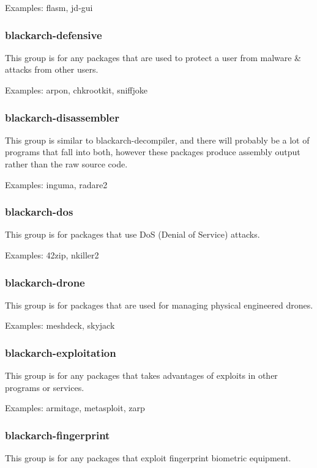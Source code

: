 \documentclass[a4paper, oneside, 11pt]{book}
\begin{document}
Examples: flasm, jd-gui

\subsubsection{blackarch-defensive}

This group is for any packages that are used to protect a user from malware \& attacks from other users.

Examples: arpon, chkrootkit, sniffjoke

\subsubsection{blackarch-disassembler}

This group is similar to blackarch-decompiler, and there will probably be a lot of programs that fall into both, however these packages produce assembly output rather than the raw source code.

Examples: inguma, radare2

\subsubsection{blackarch-dos}

This group is for packages that use DoS (Denial of Service) attacks.

Examples: 42zip, nkiller2

\subsubsection{blackarch-drone}

This group is for packages that are used for managing physical engineered drones.

Examples: meshdeck, skyjack

\subsubsection{blackarch-exploitation}

This group is for any packages that takes advantages of exploits in other programs or services.

Examples: armitage, metasploit, zarp

\subsubsection{blackarch-fingerprint}

This group is for any packages that exploit fingerprint biometric equipment.
\end{document}
